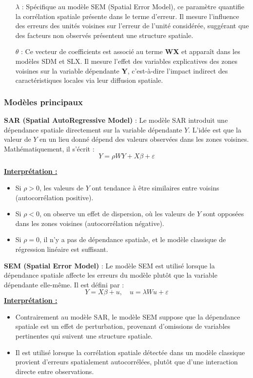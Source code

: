 \documentclass[
]{article}
\begin{document}
\begin{itemize}
\item[\(\lambda\)] : Spécifique au modèle SEM (Spatial Error Model), ce paramètre quantifie la corrélation spatiale présente dans le terme d'erreur. Il mesure l'influence des erreurs des unités voisines sur l'erreur de l'unité considérée, suggérant que des facteurs non observés présentent une structure spatiale.
\item[\(\theta\)] : Ce vecteur de coefficients est associé au terme \textbf{WX} et apparaît dans les modèles SDM et SLX. Il mesure l'effet des variables explicatives des zones voisines sur la variable dépendante \textbf{Y}, c'est-à-dire l'impact indirect des caractéristiques locales via leur diffusion spatiale.
\end{itemize}

\subsubsection{Modèles principaux}\label{moduxe8les-principaux}

\textbf{SAR (Spatial AutoRegressive Model)} : Le modèle SAR introduit
une dépendance spatiale directement sur la variable dépendante \(Y\).
L'idée est que la valeur de \(Y\) en un lieu donné dépend des valeurs
observées dans les zones voisines. Mathématiquement, il s'écrit : \[
Y = \rho W Y + X \beta + \varepsilon
\]

\underline{\textbf{Interprétation :}}

\begin{itemize}
\item Si \( \rho > 0 \), les valeurs de \( Y \) ont tendance à être similaires entre voisins (autocorrélation positive).
\item Si \( \rho < 0 \), on observe un effet de dispersion, où les valeurs de \( Y \) sont opposées dans les zones voisines (autocorrélation négative).
\item Si \( \rho = 0 \), il n’y a pas de dépendance spatiale, et le modèle classique de régression linéaire est suffisant.
\end{itemize}

\textbf{SEM (Spatial Error Model)} : Le modèle SEM est utilisé lorsque
la dépendance spatiale affecte les erreurs du modèle plutôt que la
variable dépendante elle-même. Il est défini par : \[
Y = X \beta + u, \quad u = \lambda W u + \varepsilon
\] \underline{\textbf{Interprétation :}}

\begin{itemize}
\item Contrairement au modèle SAR, le modèle SEM suppose que la dépendance spatiale est un effet de perturbation, provenant d’omissions de variables pertinentes qui suivent une structure spatiale.
\item Il est utilisé lorsque la corrélation spatiale détectée dans un modèle classique provient d’erreurs spatialement autocorrélées, plutôt que d’une interaction directe entre observations.
\end{itemize}
\end{document}
